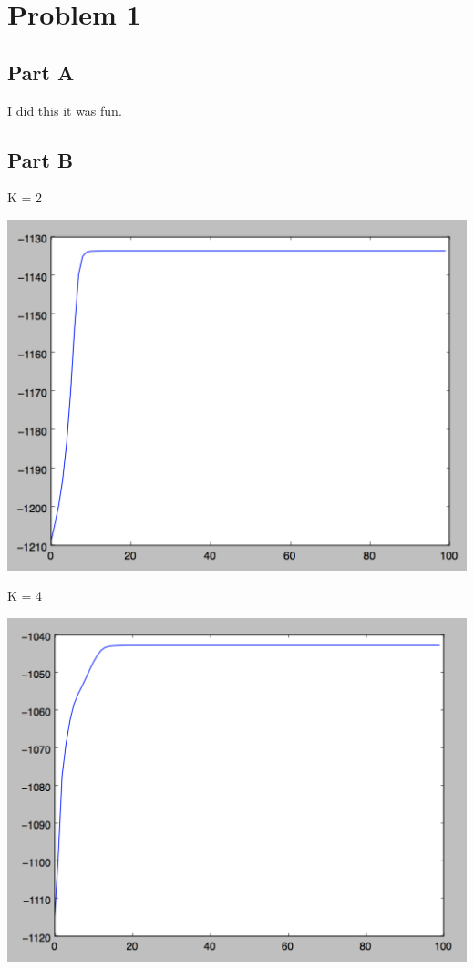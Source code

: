 \documentclass[twoside,11pt]{homework}
\begin{document}
\maketitle

\section*{Problem 1}

\subsection*{Part A}

I did this it was fun.

\subsection*{Part B}

K = 2

\includegraphics[scale=.5]{images/em_2_obj.png}

K = 4

\includegraphics[scale=.5]{images/em_4_obj.png}
\end{document}
